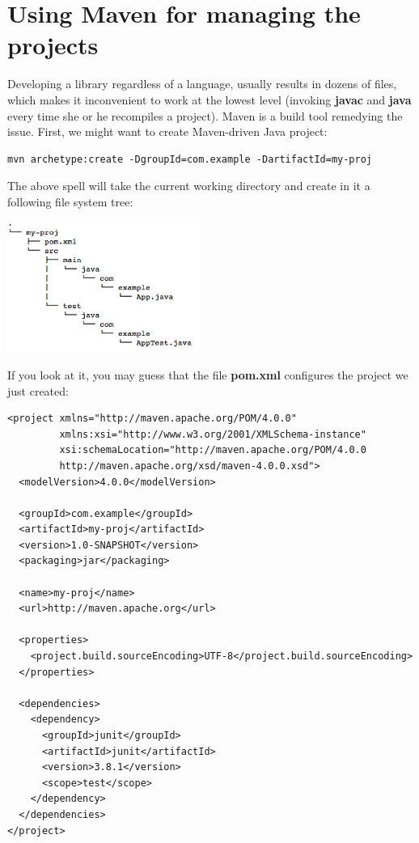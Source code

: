 \documentclass[oneside]{book}
\begin{document}
\section{Using Maven for managing the projects}
Developing a library regardless of a language, usually results in dozens of files, which makes it inconvenient to work at the lowest level (invoking \textbf{javac} and \textbf{java} every time she or he recompiles a project). Maven is a build tool remedying the issue. First, we might want to create Maven-driven Java project:
\begin{verbatim}
mvn archetype:create -DgroupId=com.example -DartifactId=my-proj
\end{verbatim}
The above spell will take the current working directory and create in it a following file system tree:
\begin{center}
\includegraphics[width=240px,keepaspectratio]{mvntree}
\end{center}
If you look at it, you may guess that the file \textbf{pom.xml} configures the project we just created:
\begin{lstlisting}
<project xmlns="http://maven.apache.org/POM/4.0.0"
         xmlns:xsi="http://www.w3.org/2001/XMLSchema-instance"
         xsi:schemaLocation="http://maven.apache.org/POM/4.0.0
         http://maven.apache.org/xsd/maven-4.0.0.xsd">
  <modelVersion>4.0.0</modelVersion>

  <groupId>com.example</groupId>
  <artifactId>my-proj</artifactId>
  <version>1.0-SNAPSHOT</version>
  <packaging>jar</packaging>

  <name>my-proj</name>
  <url>http://maven.apache.org</url>

  <properties>
    <project.build.sourceEncoding>UTF-8</project.build.sourceEncoding>
  </properties>

  <dependencies>
    <dependency>
      <groupId>junit</groupId>
      <artifactId>junit</artifactId>
      <version>3.8.1</version>
      <scope>test</scope>
    </dependency>
  </dependencies>
</project>
\end{lstlisting}
\end{document}
